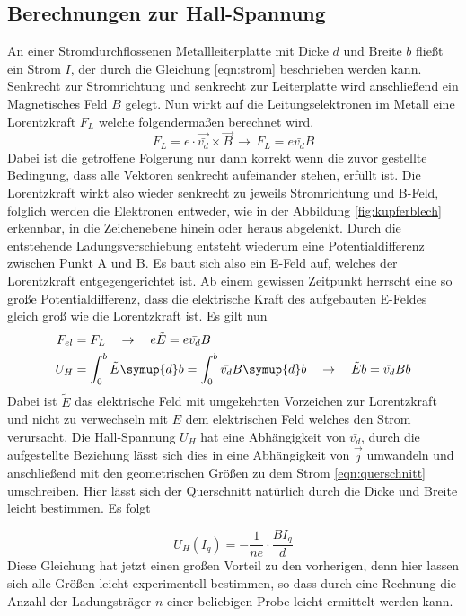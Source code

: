 \subsection{Berechnungen zur Hall-Spannung}
An einer Stromdurchflossenen Metallleiterplatte mit Dicke $d$ und Breite $b$ fließt ein Strom $I$, der durch die Gleichung \eqref{eqn:strom} beschrieben werden kann. Senkrecht
zur Stromrichtung und senkrecht zur Leiterplatte wird anschließend ein Magnetisches Feld $B$ gelegt. Nun wirkt auf die Leitungselektronen im Metall eine Lorentzkraft $F_{L}$ welche folgendermaßen berechnet wird.
\begin{equation}
\label{eqn:lorentz}
F_{L} =  e \cdot \vec{\bar{v_{d}}} \times \vec{B} \, \to \, F_{L} = e \bar{v_{d}} B
\end{equation}
Dabei ist die getroffene Folgerung nur dann korrekt wenn die zuvor gestellte Bedingung, dass alle Vektoren senkrecht aufeinander stehen, erfüllt ist.
Die Lorentzkraft wirkt also wieder senkrecht zu jeweils Stromrichtung und B-Feld, folglich werden die Elektronen entweder, wie in der Abbildung \ref{fig:kupferblech} erkennbar, in die Zeichenebene hinein oder heraus
abgelenkt. Durch die entstehende Ladungsverschiebung entsteht wiederum eine Potentialdifferenz zwischen Punkt A und B. Es baut sich also ein E-Feld auf, welches der Lorentzkraft entgegengerichtet ist.
Ab einem gewissen Zeitpunkt herrscht eine so große Potentialdifferenz, dass die elektrische Kraft des aufgebauten E-Feldes gleich groß wie die Lorentzkraft ist.
Es gilt nun
\begin{align*}
F_{el} &= F_{L} \quad \to \quad e \tilde{E} = e \bar{v_{d}} B \\
U_{H} &= \int_{0}^{b} \tilde{E} \symup{d}b = \int_{0}^{b} \bar{v_{d}} B \symup{d}b \quad \to \quad \tilde{E} b = \bar{v_{d}} B b
\end{align*}
Dabei ist $\tilde{E}$ das elektrische Feld mit umgekehrten Vorzeichen zur Lorentzkraft und nicht zu verwechseln mit $E$ dem elektrischen Feld welches den Strom verursacht.
Die Hall-Spannung $U_{H}$ hat eine Abhängigkeit von $\bar{v_{d}}$, durch die aufgestellte Beziehung \label{eqn:stromdichteunddrift} lässt sich dies in eine Abhängigkeit von $\vec{j}$ umwandeln und 
anschließend mit den geometrischen Größen zu dem Strom \eqref{eqn:querschnitt} umschreiben. Hier lässt sich der Querschnitt natürlich durch die Dicke und Breite leicht bestimmen. Es folgt

\begin{equation}
\label{eqn:hallspannungfuern}
U_{H}(I_{q}) = - \frac{1}{n e} \cdot \frac{B I_{q}}{d}
\end{equation}
Diese Gleichung hat jetzt einen großen Vorteil zu den vorherigen, denn hier lassen sich alle Größen leicht experimentell bestimmen, so dass 
durch eine Rechnung die Anzahl der Ladungsträger $n$ einer beliebigen Probe leicht ermittelt werden kann.

